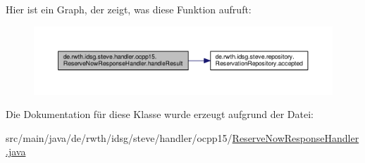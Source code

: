Hier ist ein Graph, der zeigt, was diese Funktion aufruft\+:\nopagebreak
\begin{figure}[H]
\begin{center}
\leavevmode
\includegraphics[width=350pt]{classde_1_1rwth_1_1idsg_1_1steve_1_1handler_1_1ocpp15_1_1_reserve_now_response_handler_a8a9abad92eff0284e98129aaf31e811e_cgraph}
\end{center}
\end{figure}




Die Dokumentation für diese Klasse wurde erzeugt aufgrund der Datei\+:\begin{DoxyCompactItemize}
\item 
src/main/java/de/rwth/idsg/steve/handler/ocpp15/\hyperlink{_reserve_now_response_handler_8java}{Reserve\+Now\+Response\+Handler.\+java}\end{DoxyCompactItemize}
